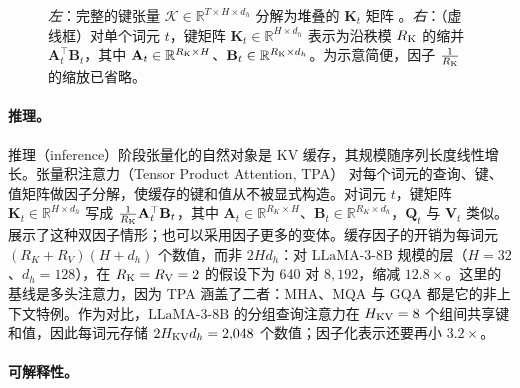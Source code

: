 \documentclass[11pt]{article}
\newcommand{\R}{\mathbb{R}}
\newcommand{\ten}[1]{\mathcal{#1}}
\newcommand{\mat}[1]{\mathbf{#1}}
\newcommand{\llama}{\text{LLaMA-3-8B}}
\begin{document}
\begin{figure}[!htbp]
{}
  \caption{\textit{左}：完整的键张量 $\ten{K}\in\R^{T\times H \times d_h}$ 分解为堆叠的 $\mat{K}_t$ 矩阵 \cite{zhang2026tpa}。\textit{右}：（虚线框）对单个词元 $t$，键矩阵 $\mat{K}_t\in\R^{H \times d_h}$ 表示为沿秩模 $R_{\rm K}$ 的缩并 $\mat{A}_t^\top\mat{B}_t$，其中 $\mat{A}_t\in\R^{R_{\rm K}\times H}$、$\mat{B}_t\in\R^{R_{\rm K}\times d_h}$。为示意简便，因子 $\frac{1}{R_{\rm K}}$ 的缩放已省略。}
\label{fig:example-inference}
\end{figure}

\paragraph{推理。} 推理（inference）阶段张量化的自然对象是 KV 缓存，其规模随序列长度线性增长。张量积注意力（Tensor Product Attention, TPA）\cite{zhang2026tpa} 对每个词元的查询、键、值矩阵做因子分解，使缓存的键和值从不被显式构造。对词元 $t$，键矩阵 $\mat{K}_t\in\R^{H\times d_h}$ 写成 $\frac{1}{R_{\rm K}}\mat{A}_t^\top\mat{B}_t$，其中 $\mat{A}_t\in\R^{R_K\times H}$、$\mat{B}_t\in\R^{R_K\times d_h}$，$\mat{Q}_t$ 与 $\mat{V}_t$ 类似。 展示了这种双因子情形；也可以采用因子更多的变体。缓存因子的开销为每词元 $(R_K+R_V)(H+d_h)$ 个数值，而非 $2Hd_h$：对 $\llama$ 规模的层（$H=32$、$d_h=128$），在 $R_{\rm K} = R_{\rm V} = 2$ 的假设下为 $640$ 对 $8{,}192$，缩减 $12.8\times$。这里的基线是多头注意力，因为 TPA 涵盖了二者：MHA、MQA 与 GQA 都是它的非上下文特例。作为对比，$\llama$ 的分组查询注意力在 $H_{\rm KV}=8$ 个组间共享键和值，因此每词元存储 $2H_{\rm KV}d_h=2{,}048$ 个数值；因子化表示还要再小 $3.2\times$。

\paragraph{可解释性。} 
\end{document}
